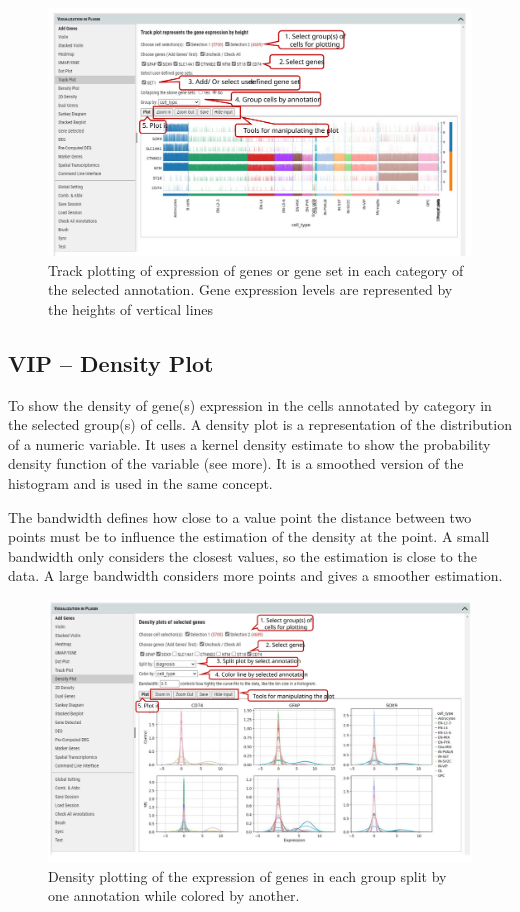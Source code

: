 \documentclass[
]{article}
\begin{document}
\begin{figure}
\centering
\includegraphics{figures/F12_label.svg}
\caption{Track plotting of expression of genes or gene set in each category of the selected annotation. Gene expression levels are represented by the heights of vertical lines}
\end{figure}

\hypertarget{vip-density-plot}{%
\subsection{VIP -- Density Plot}\label{vip-density-plot}}

To show the density of gene(s) expression in the cells annotated by category in the selected group(s) of cells. A density plot is a representation of the distribution of a numeric variable. It uses a kernel density estimate to show the probability density function of the variable (see more). It is a smoothed version of the histogram and is used in the same concept.

The bandwidth defines how close to a value point the distance between two points must be to influence the estimation of the density at the point. A small bandwidth only considers the closest values, so the estimation is close to the data. A large bandwidth considers more points and gives a smoother estimation.

\begin{figure}
\centering
\includegraphics{figures/F13_label.svg}
\caption{Density plotting of the expression of genes in each group split by one annotation while colored by another.}
\end{figure}
\end{document}
